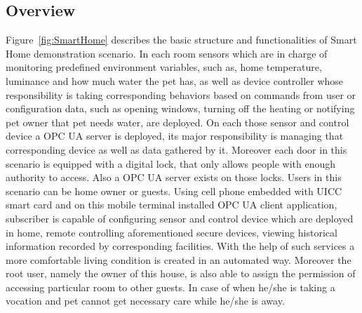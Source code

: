 \documentclass[]{llncs}
\begin{document}
\subsection{Overview}
Figure~\ref{fig:SmartHome} describes the basic structure and functionalities of Smart Home demonstration scenario. 
In each room sensors which are in charge of monitoring predefined environment variables, such as, home temperature, luminance and how much water the pet has, as well as device controller whose responsibility is taking corresponding behaviors  based on commands from user or configuration data, such as opening windows, turning off the heating or notifying pet owner that pet needs water, are deployed. On each those sensor and control device a OPC UA server is deployed, its major responsibility is managing that corresponding device as well as data gathered by it. Moreover each door in this scenario is equipped with a digital lock, that only allows people with enough authority to access. Also a OPC UA server exists on those locks. Users in this scenario can be home owner or guests. Using cell phone embedded with UICC smart card and on this mobile terminal installed OPC UA client application, subscriber is capable of configuring sensor and control device which are deployed in home, remote controlling aforementioned secure devices, viewing historical information recorded by corresponding facilities.  With the help of such services a more comfortable living condition is created in an automated way.  Moreover the root user, namely the owner of this house, is also able to assign the permission of accessing particular room to other guests. In case of when he/she is taking a vocation and pet cannot get necessary care while he/she is away. 
\end{document}
